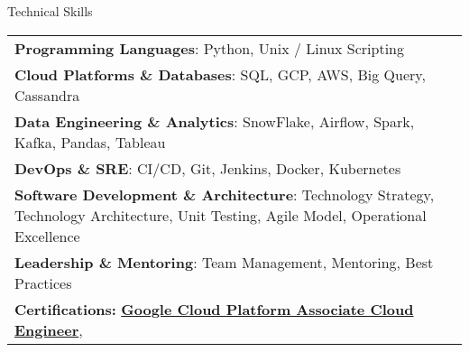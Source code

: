 \documentclass{resume} %
\begin{document}
    \begin{rSection}{Technical Skills}
        \begin{tabular}{ @{} l @{\hspace{1ex}} l }
                                \textbf{Programming Languages}: Python, Unix / Linux Scripting\\
                                \textbf{Cloud Platforms \& Databases}: SQL, GCP, AWS, Big Query, Cassandra\\
                                \textbf{Data Engineering \& Analytics}: SnowFlake, Airflow, Spark, Kafka, Pandas, Tableau\\
                                \textbf{DevOps \& SRE}: CI/CD, Git, Jenkins, Docker, Kubernetes\\
                                \textbf{Software Development \& Architecture}: Technology Strategy, Technology Architecture, Unit Testing, Agile Model, Operational Excellence\\
                                \textbf{Leadership \& Mentoring}: Team Management, Mentoring, Best Practices\\
                        \textbf{Certifications:} 
                                            \href{}{\textbf{Google Cloud Platform Associate Cloud Engineer}},\\
                                 
        \end{tabular}
    \end{rSection}
 
\end{document}
